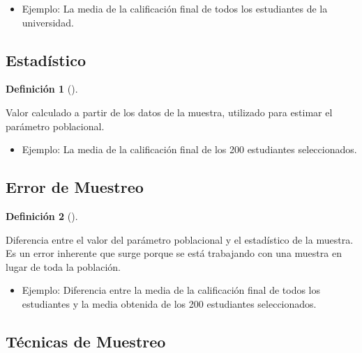 \documentclass[
  us-letterpaper,
]{scrreprt}
\providecommand{\tightlist}{%
  \setlength{\itemsep}{0pt}\setlength{\parskip}{0pt}}\usepackage{longtable,booktabs,array}
\theoremstyle{plain}
\theoremstyle{plain}
\theoremstyle{definition}
\newtheorem{definition}{Definición}[chapter]
\theoremstyle{remark}
\begin{document}
\begin{itemize}
\tightlist
\item
  Ejemplo: La media de la calificación final de todos los estudiantes de
  la universidad.
\end{itemize}

\subsection{Estadístico}\label{estaduxedstico-1}

\begin{definition}[]\protect\hypertarget{def-estadistico}{}\label{def-estadistico}

Valor calculado a partir de los datos de la muestra, utilizado para
estimar el parámetro poblacional.

\end{definition}

\begin{itemize}
\tightlist
\item
  Ejemplo: La media de la calificación final de los 200 estudiantes
  seleccionados.
\end{itemize}

\subsection{Error de Muestreo}\label{error-de-muestreo}

\begin{definition}[]\protect\hypertarget{def-error_muestreo}{}\label{def-error_muestreo}

Diferencia entre el valor del parámetro poblacional y el estadístico de
la muestra. Es un error inherente que surge porque se está trabajando
con una muestra en lugar de toda la población.

\end{definition}

\begin{itemize}
\tightlist
\item
  Ejemplo: Diferencia entre la media de la calificación final de todos
  los estudiantes y la media obtenida de los 200 estudiantes
  seleccionados.
\end{itemize}

\subsection{Técnicas de Muestreo}\label{tuxe9cnicas-de-muestreo}
\end{document}
